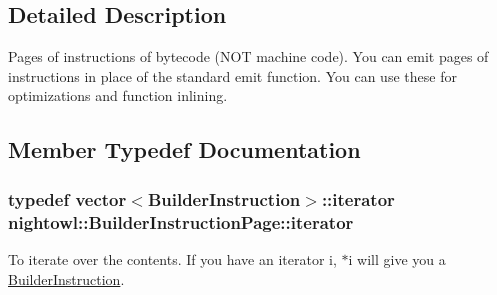 \subsection{Detailed Description}
Pages of instructions of bytecode (N\-O\-T machine code). You can emit pages of instructions in place of the standard emit function. You can use these for optimizations and function inlining. 

\subsection{Member Typedef Documentation}
\hypertarget{classnightowl_1_1BuilderInstructionPage_a58693e169efec9daf99b36da52049099}{
\subsubsection[{iterator}]{\setlength{\rightskip}{0pt plus 5cm}typedef vector$<${\bf Builder\-Instruction}$>$\-::{\bf iterator} {\bf nightowl\-::\-Builder\-Instruction\-Page\-::iterator}}}\label{classnightowl_1_1BuilderInstructionPage_a58693e169efec9daf99b36da52049099}
To iterate over the contents. If you have an iterator i, $\ast$i will give you a \hyperlink{classnightowl_1_1BuilderInstruction}{Builder\-Instruction}. 

